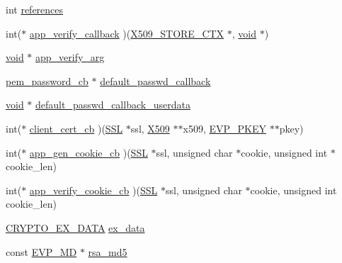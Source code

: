 \begin{DoxyCompactItemize}
\begin{tabbing}
\end{tabbing}\item 
int \hyperlink{structssl__ctx__st_a146fdb34d9a909e530adf8b189481195}{references}
\item 
int($\ast$ \hyperlink{structssl__ctx__st_acf39a606edc5bb575216bc7bec28b926}{app\+\_\+verify\+\_\+callback} )(\hyperlink{crypto_2ossl__typ_8h_ae681945a2cf88d6337137dc0260a1545}{X509\+\_\+\+S\+T\+O\+R\+E\+\_\+\+C\+TX} $\ast$, \hyperlink{hw__4758__cca_8h_afad4d591c7931ff6dc5bf69c76c96aa0}{void} $\ast$)
\item 
\hyperlink{hw__4758__cca_8h_afad4d591c7931ff6dc5bf69c76c96aa0}{void} $\ast$ \hyperlink{structssl__ctx__st_aa6f37e529d7ccf39c110549b5d645275}{app\+\_\+verify\+\_\+arg}
\item 
\hyperlink{include_2openssl_2pem_8h_a3d060f1c7cb9a37a92edf7ad3b7c4fa9}{pem\+\_\+password\+\_\+cb} $\ast$ \hyperlink{structssl__ctx__st_a8dc0d25dca9a3f4ab7cdd3505f61a6eb}{default\+\_\+passwd\+\_\+callback}
\item 
\hyperlink{hw__4758__cca_8h_afad4d591c7931ff6dc5bf69c76c96aa0}{void} $\ast$ \hyperlink{structssl__ctx__st_a5978b0907ec6d9e4e07e9f1f23203361}{default\+\_\+passwd\+\_\+callback\+\_\+userdata}
\item 
int($\ast$ \hyperlink{structssl__ctx__st_a82686fb1e9e6b347286f43fd8745c963}{client\+\_\+cert\+\_\+cb} )(\hyperlink{crypto_2ossl__typ_8h_a71f21e09bf365489dab9d85bd4785e24}{S\+SL} $\ast$ssl, \hyperlink{crypto_2ossl__typ_8h_a4f666bde6518f95deb3050c54b408416}{X509} $\ast$$\ast$x509, \hyperlink{crypto_2ossl__typ_8h_a2fca4fef9e4c7a2a739b1ea04acb56ce}{E\+V\+P\+\_\+\+P\+K\+EY} $\ast$$\ast$pkey)
\item 
int($\ast$ \hyperlink{structssl__ctx__st_a225f64b68ff31a25dae5073768f6a1c2}{app\+\_\+gen\+\_\+cookie\+\_\+cb} )(\hyperlink{crypto_2ossl__typ_8h_a71f21e09bf365489dab9d85bd4785e24}{S\+SL} $\ast$ssl, unsigned char $\ast$cookie, unsigned int $\ast$cookie\+\_\+len)
\item 
int($\ast$ \hyperlink{structssl__ctx__st_a42484c1fffceb0dc184fd2ab9e78b569}{app\+\_\+verify\+\_\+cookie\+\_\+cb} )(\hyperlink{crypto_2ossl__typ_8h_a71f21e09bf365489dab9d85bd4785e24}{S\+SL} $\ast$ssl, unsigned char $\ast$cookie, unsigned int cookie\+\_\+len)
\item 
\hyperlink{crypto_2ossl__typ_8h_a7eaff1c18057495d8af18f22d1370b51}{C\+R\+Y\+P\+T\+O\+\_\+\+E\+X\+\_\+\+D\+A\+TA} \hyperlink{structssl__ctx__st_ac3e4fd59d6ee44a81f3a58114613c1e2}{ex\+\_\+data}
\item 
const \hyperlink{crypto_2ossl__typ_8h_aac66cf010326fa9a927c2a34888f45d3}{E\+V\+P\+\_\+\+MD} $\ast$ \hyperlink{structssl__ctx__st_abe46b04e770ef2fba44e4274f908f063}{rsa\+\_\+md5}

\end{DoxyCompactItemize}
